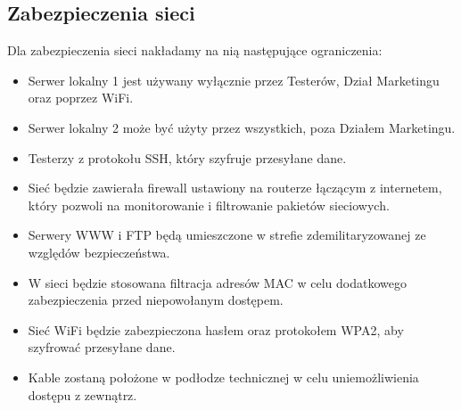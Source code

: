 \documentclass[a4paper,12pt]{extarticle}  %
\begin{document}
\subsection{Zabezpieczenia sieci}
Dla zabezpieczenia sieci nakładamy na nią następujące ograniczenia:
\begin{itemize}
    \item Serwer lokalny 1 jest używany wyłącznie przez Testerów, Dział Marketingu oraz poprzez WiFi.
    \item Serwer lokalny 2 może być użyty przez wszystkich, poza Działem Marketingu.
    \item Testerzy z protokołu SSH, który szyfruje przesyłane dane.
    \item Sieć będzie zawierała firewall ustawiony na routerze łączącym z internetem, który pozwoli na monitorowanie i filtrowanie pakietów sieciowych.
    \item Serwery WWW i FTP będą umieszczone w strefie zdemilitaryzowanej ze względów bezpieczeństwa.
    \item W sieci będzie stosowana filtracja adresów MAC w celu dodatkowego zabezpieczenia przed niepowołanym dostępem.
    \item Sieć WiFi będzie zabezpieczona hasłem oraz protokołem WPA2, aby szyfrować przesyłane dane.
    \item Kable zostaną położone w podłodze technicznej w celu uniemożliwienia dostępu z zewnątrz.
\end{itemize}
\end{document}
